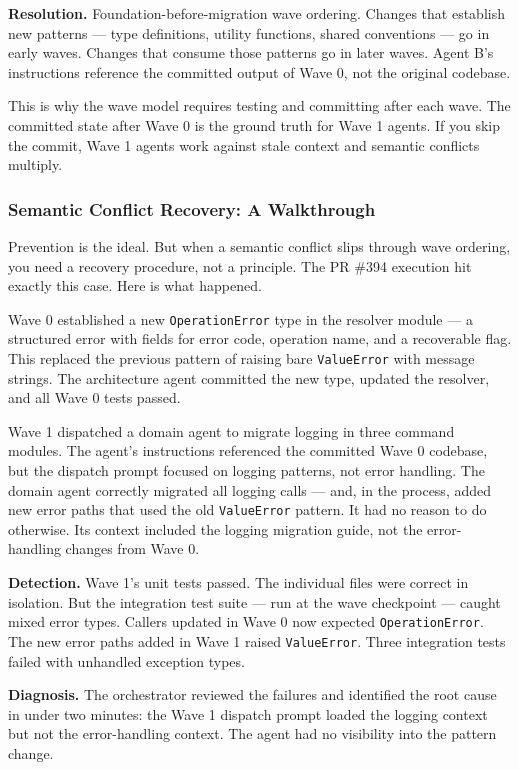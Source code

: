 \documentclass[
  a4paper,
  DIV=11,
  numbers=noendperiod]{scrreprt}
\begin{document}
\textbf{Resolution.} Foundation-before-migration wave ordering. Changes
that establish new patterns --- type definitions, utility functions,
shared conventions --- go in early waves. Changes that consume those
patterns go in later waves. Agent B's instructions reference the
committed output of Wave 0, not the original codebase.

This is why the wave model requires testing and committing after each
wave. The committed state after Wave 0 is the ground truth for Wave 1
agents. If you skip the commit, Wave 1 agents work against stale context
and semantic conflicts multiply.

\subsubsection{Semantic Conflict Recovery: A
Walkthrough}\label{semantic-conflict-recovery-a-walkthrough}

Prevention is the ideal. But when a semantic conflict slips through wave
ordering, you need a recovery procedure, not a principle. The PR \#394
execution hit exactly this case. Here is what happened.

Wave 0 established a new \texttt{OperationError} type in the resolver
module --- a structured error with fields for error code, operation
name, and a recoverable flag. This replaced the previous pattern of
raising bare \texttt{ValueError} with message strings. The architecture
agent committed the new type, updated the resolver, and all Wave 0 tests
passed.

Wave 1 dispatched a domain agent to migrate logging in three command
modules. The agent's instructions referenced the committed Wave 0
codebase, but the dispatch prompt focused on logging patterns, not error
handling. The domain agent correctly migrated all logging calls --- and,
in the process, added new error paths that used the old
\texttt{ValueError} pattern. It had no reason to do otherwise. Its
context included the logging migration guide, not the error-handling
changes from Wave 0.

\textbf{Detection.} Wave 1's unit tests passed. The individual files
were correct in isolation. But the integration test suite --- run at the
wave checkpoint --- caught mixed error types. Callers updated in Wave 0
now expected \texttt{OperationError}. The new error paths added in Wave
1 raised \texttt{ValueError}. Three integration tests failed with
unhandled exception types.

\textbf{Diagnosis.} The orchestrator reviewed the failures and
identified the root cause in under two minutes: the Wave 1 dispatch
prompt loaded the logging context but not the error-handling context.
The agent had no visibility into the pattern change.
\end{document}
